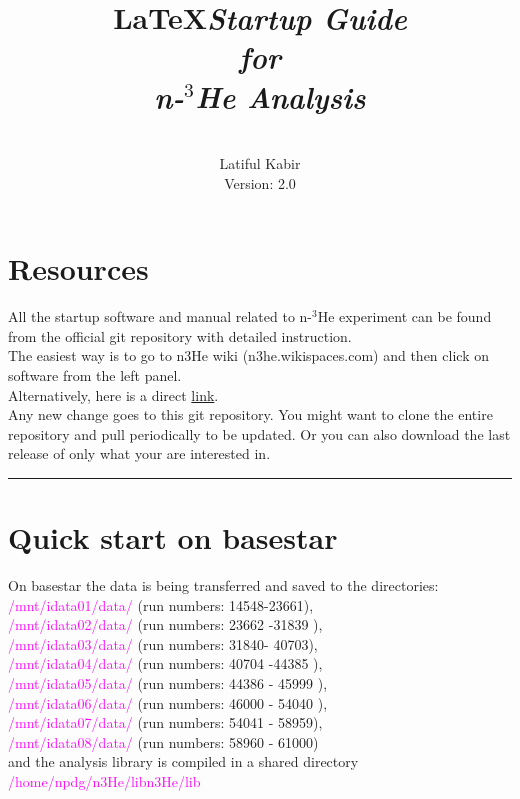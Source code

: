 \documentclass[12pt]{article}
\title{\LaTeX}
\date{}
\title{\emph{\huge\textbf{Startup Guide \\ for \\n-$^3$He Analysis}}
}
\author{\\Latiful Kabir\\
Version: 2.0
}
\begin{document}
  \maketitle
  
\newpage  
\tableofcontents
\newpage
\setcounter{tocdepth}{2}

\section{Resources}
All the startup software and manual related to n-$^3$He experiment can be found from the official git repository with detailed instruction. \\
The easiest way is to go to n3He wiki (n3he.wikispaces.com) and then click on software from the left panel.  \\
Alternatively, here is a direct \href{http://latifkabir.github.io/n3He_Soft/}{link}.\\
Any new change goes to this  git repository. You might want to clone the entire repository and pull periodically to be updated. Or you can also download the last release of only what your are interested in.  

\noindent
{\color{red} \rule{\linewidth}{1mm} }
 
\newpage
\section{Quick start on basestar}
On basestar the data is being transferred and saved to the directories: \\ \textcolor{magenta}{ /mnt/idata01/data/ } (run numbers: 14548-23661),\\ \textcolor{magenta}{ /mnt/idata02/data/ } (run numbers: 23662 -31839 ),\\ \textcolor{magenta}{ /mnt/idata03/data/ } (run numbers: 31840- 40703),\\ \textcolor{magenta}{ /mnt/idata04/data/ } (run numbers: 40704 -44385 ),\\ \textcolor{magenta}{ /mnt/idata05/data/ } (run numbers: 44386 - 45999 ),\\ \textcolor{magenta}{ /mnt/idata06/data/ } (run numbers: 46000 - 54040 ),\\ \textcolor{magenta}{ /mnt/idata07/data/ } (run numbers: 54041 - 58959),\\ \textcolor{magenta}{ /mnt/idata08/data/ } (run numbers: 58960 - 61000)\\and the analysis library is compiled in a shared directory \textcolor{magenta}{ /home/npdg/n3He/libn3He/lib} \\
\end{document}
